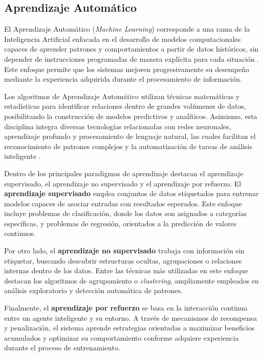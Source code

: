 \subsection{Aprendizaje Automático}

El Aprendizaje Automático (\textit{Machine Learning}) corresponde a una rama de la Inteligencia Artificial enfocada en el desarrollo de modelos computacionales capaces de aprender patrones y comportamientos a partir de datos históricos, sin depender de instrucciones programadas de manera explícita para cada situación \parencite{bk_russell2009intart}. Este enfoque permite que los sistemas mejoren progresivamente su desempeño mediante la experiencia adquirida durante el procesamiento de información.

Los algoritmos de Aprendizaje Automático utilizan técnicas matemáticas y estadísticas para identificar relaciones dentro de grandes volúmenes de datos, posibilitando la construcción de modelos predictivos y analíticos. Asimismo, esta disciplina integra diversas tecnologías relacionadas con redes neuronales, aprendizaje profundo y procesamiento de lenguaje natural, las cuales facilitan el reconocimiento de patrones complejos y la automatización de tareas de análisis inteligente \parencite{bk_alpaydin2014ml}.

Dentro de los principales paradigmas de aprendizaje destacan el aprendizaje supervisado, el aprendizaje no supervisado y el aprendizaje por refuerzo. El \textbf{aprendizaje supervisado} emplea conjuntos de datos etiquetados para entrenar modelos capaces de asociar entradas con resultados esperados. Este enfoque incluye problemas de clasificación, donde los datos son asignados a categorías específicas, y problemas de regresión, orientados a la predicción de valores continuos.

Por otro lado, el \textbf{aprendizaje no supervisado} trabaja con información sin etiquetar, buscando descubrir estructuras ocultas, agrupaciones o relaciones internas dentro de los datos. Entre las técnicas más utilizadas en este enfoque destacan los algoritmos de agrupamiento o \textit{clustering}, ampliamente empleados en análisis exploratorio y detección automática de patrones.

Finalmente, el \textbf{aprendizaje por refuerzo} se basa en la interacción continua entre un agente inteligente y su entorno. A través de mecanismos de recompensa y penalización, el sistema aprende estrategias orientadas a maximizar beneficios acumulados y optimizar su comportamiento conforme adquiere experiencia durante el proceso de entrenamiento.

